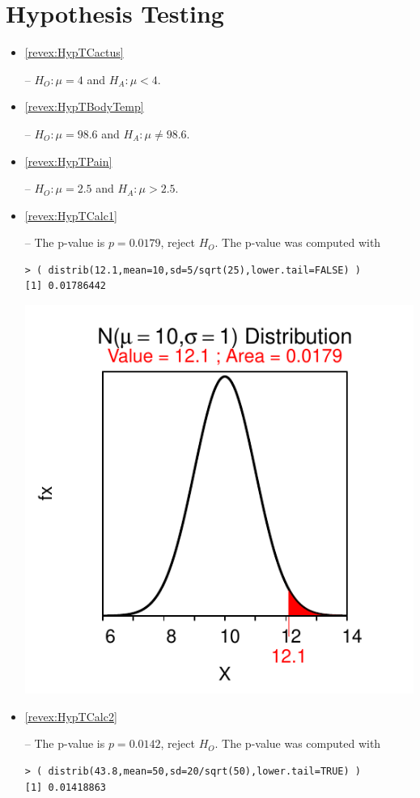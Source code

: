 \documentclass[10pt,openany]{book}\usepackage[]{graphicx}\usepackage[]{color}
\makeatletter
\newenvironment{kframe}{%
 \def\at@end@of@kframe{}%
 \ifinner\ifhmode%
  \def\at@end@of@kframe{\end{minipage}}%
  \begin{minipage}{\columnwidth}%
 \fi\fi%
 \def\FrameCommand##1{\hskip\@totalleftmargin \hskip-\fboxsep
 \colorbox{shadecolor}{##1}\hskip-\fboxsep
     \hskip-\linewidth \hskip-\@totalleftmargin \hskip\columnwidth}%
 \MakeFramed {\advance\hsize-\width
   \@totalleftmargin\z@ \linewidth\hsize
   \@setminipage}}%
 {\par\unskip\endMakeFramed%
 \at@end@of@kframe}
\newenvironment{knitrout}{}{} %
\makeatother
\begin{document}
\section*{Hypothesis Testing}
\begin{itemize}
  \item \hypertarget{ans:HypTCactus}{\ref{revex:HypTCactus}} -- $H_{O}:\mu=4$ and $H_{A}:\mu<4$.
  \item \hypertarget{ans:HypTBodyTemp}{\ref{revex:HypTBodyTemp}} -- $H_{O}:\mu=98.6$ and $H_{A}:\mu\neq98.6$.
  \item \hypertarget{ans:HypTPain}{\ref{revex:HypTPain}} -- $H_{O}:\mu=2.5$ and $H_{A}:\mu>2.5$.

  \item \hypertarget{ans:HypTCalc1}{\ref{revex:HypTCalc1}} -- The p-value is $p=0.0179$, reject $H_{O}$.  The p-value was computed with
\begin{knitrout}
\color{fgcolor}\begin{kframe}
\begin{verbatim}
> ( distrib(12.1,mean=10,sd=5/sqrt(25),lower.tail=FALSE) )
[1] 0.01786442
\end{verbatim}
\end{kframe}

{\centering \includegraphics[width=.4\linewidth]{Figs/HypTCalc1-1} 

}



\end{knitrout}
  \item \hypertarget{ans:HypTCalc2}{\ref{revex:HypTCalc2}} -- The p-value is $p=0.0142$, reject $H_{O}$.  The p-value was computed with
\begin{knitrout}
\color{fgcolor}\begin{kframe}
\begin{verbatim}
> ( distrib(43.8,mean=50,sd=20/sqrt(50),lower.tail=TRUE) )
[1] 0.01418863
\end{verbatim}
\end{kframe}


\end{knitrout}
\end{itemize}
\end{document}
